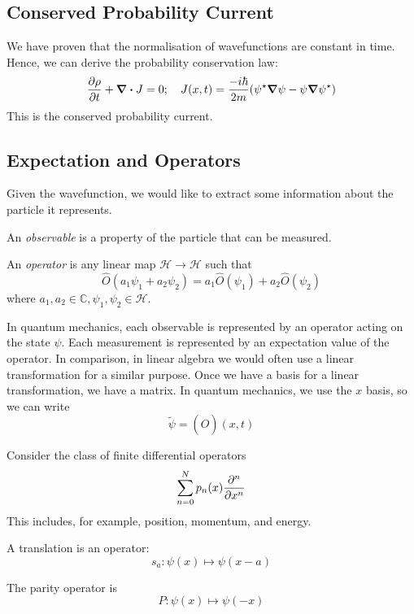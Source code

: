 \subsection{Conserved Probability Current}
We have proven that the normalisation of wavefunctions are constant in time.
Hence, we can derive the probability conservation law:
\[
	\pdv{\rho}{t}(x,t) + \div{J} = 0;\quad J(x,t) = \frac{-i\hbar}{2m} \qty(\psi^\star \grad{\psi} - \psi \grad{\psi^\star} )
\]
This is the conserved probability current.

\subsection{Expectation and Operators}
Given the wavefunction, we would like to extract some information about the particle it represents.
\begin{definition}
	An \textit{observable} is a property of the particle that can be measured.
\end{definition}
\begin{definition}
	An \textit{operator} is any linear map \( \mathcal H \to \mathcal H \) such that
	\[
		\hat O(a_1 \psi_1 + a_2 \psi_2) = a_1 \hat O(\psi_1) + a_2 \hat O(\psi_2)
	\]
	where \( a_1, a_2 \in \mathbb C, \psi_1, \psi_2 \in \mathcal H \).
\end{definition}
\noindent In quantum mechanics, each observable is represented by an operator acting on the state \( \psi \).
Each measurement is represented by an expectation value of the operator.
In comparison, in linear algebra we would often use a linear transformation for a similar purpose.
Once we have a basis for a linear transformation, we have a matrix.
In quantum mechanics, we use the \( x \) basis, so we can write
\[
	\widetilde \psi = (\hat O)(x, t)
\]
\begin{example}
	Consider the class of finite differential operators
	\[
		\sum_{n=0}^N p_n(x) \pdv[n]{x}
	\]
	This includes, for example, position, momentum, and energy.
\end{example}
\begin{example}
	A translation is an operator:
	\[
		s_a \colon \psi(x) \mapsto \psi(x-a)
	\]
\end{example}
\begin{example}
	The parity operator is
	\[
		P \colon \psi(x) \mapsto \psi(-x)
	\]
\end{example}

